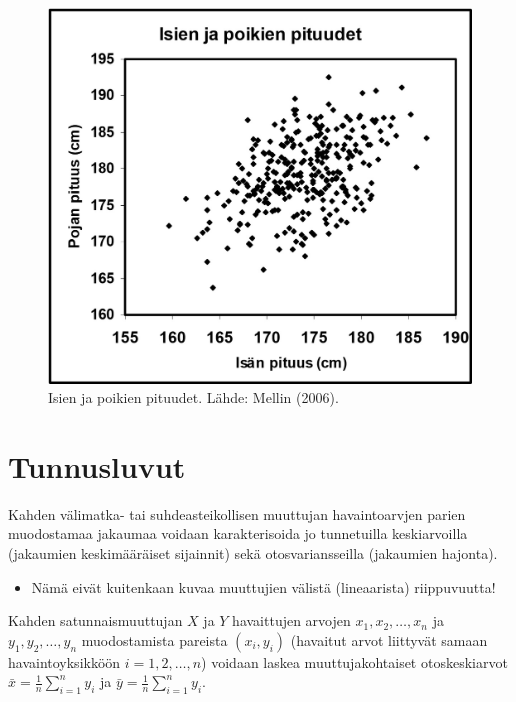 \documentclass[
]{report}
\providecommand{\tightlist}{%
  \setlength{\itemsep}{0pt}\setlength{\parskip}{0pt}}\usepackage{longtable,booktabs,array}
\begin{document}
\begin{figure}

{\centering \includegraphics[width=4.84375in,height=\textheight]{images/Isien-poikien-pituudet-Mellin.jpg}

}

\caption{Isien ja poikien pituudet. Lähde: Mellin (2006).}

\end{figure}

\hypertarget{tunnusluvut}{%
\section{Tunnusluvut}\label{tunnusluvut}}

Kahden välimatka- tai suhdeasteikollisen muuttujan havaintoarvjen parien
muodostamaa jakaumaa voidaan karakterisoida jo tunnetuilla keskiarvoilla
(jakaumien keskimääräiset sijainnit) sekä otosvariansseilla (jakaumien
hajonta).

\begin{itemize}
\tightlist
\item
  Nämä eivät kuitenkaan kuvaa muuttujien välistä (lineaarista)
  riippuvuutta!
\end{itemize}

Kahden satunnaismuuttujan \(X\) ja \(Y\) havaittujen arvojen
\(x_1,x_2,\dots,x_n\) ja \(y_1, y_2,\dots,y_n\) muodostamista pareista
\((x_i, y_i)\) (havaitut arvot liittyvät samaan havaintoyksikköön
\(i=1,2,\dots,n\)) voidaan laskea muuttujakohtaiset otoskeskiarvot
\(\bar{x} = \frac{1}{n}\sum_{i=1}^n y_i\) ja
\(\bar{y} = \frac{1}{n}\sum_{i=1}^n y_i\).
\end{document}
